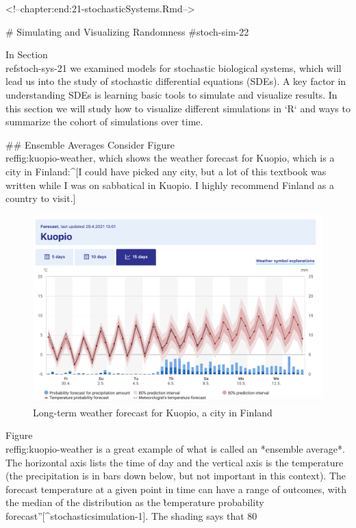 \documentclass[
]{book}
\theoremstyle{definition}
\theoremstyle{definition}
\theoremstyle{definition}
\theoremstyle{remark}
\begin{document}
<!--chapter:end:21-stochasticSystems.Rmd-->

# Simulating and Visualizing Randomness {#stoch-sim-22}

In Section \\ref{stoch-sys-21} we examined models for stochastic biological systems, which will lead us into the study of stochastic differential equations (SDEs). A key factor in understanding SDEs is learning basic tools to simulate and visualize results. In this section we will study how to visualize different simulations in `R` and ways to summarize the cohort of simulations over time.

## Ensemble Averages
Consider Figure \\ref{fig:kuopio-weather}, which shows the weather forecast for Kuopio, which is a city in Finland:^[I could have picked any city, but a lot of this textbook was written while I was on sabbatical in Kuopio. I highly recommend Finland as a country to visit.]

\begin{figure}

{\centering \includegraphics[width=5in]{figures/22-simulation/kuopio} 

}

\caption{Long-term weather forecast for Kuopio, a city in Finland}\label{fig:kuopio-weather}
\end{figure}

Figure \\ref{fig:kuopio-weather} is a great example of what is called an *ensemble average*. The horizontal axis lists the time of day and the vertical axis is the temperature (the precipitation is in bars down below, but not important in this context). The forecast temperature at a given point in time can have a range of outcomes, with the median of the distribution as the \`\`temperature probability forecast''[^stochasticsimulation-1]. The shading says that 80%
\end{document}
